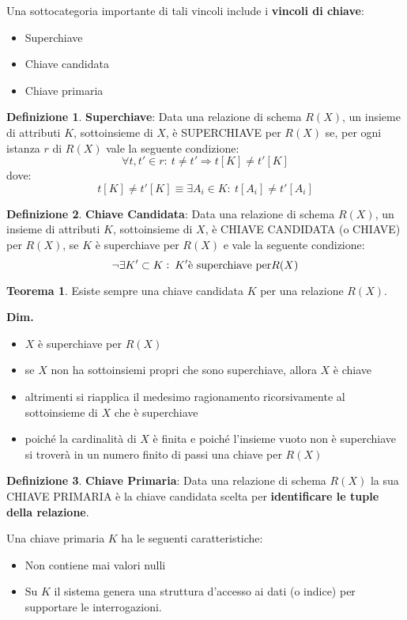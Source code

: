 \documentclass[a4paper, 10pt]{article}
\theoremstyle{definition}
\newtheorem*{defn}{Definizione}
\newtheorem*{theor}{Teorema}
\begin{document}
			Una sottocategoria importante di tali vincoli include i
			\textbf{vincoli di chiave}:
			\begin{itemize}
				\item Superchiave
				\item Chiave candidata
				\item Chiave primaria
			\end{itemize}
			
			\begin{defn}
				\textbf{Superchiave}: Data una relazione di schema $R(X)$, un insieme di attributi $K$, sottoinsieme di $X$, è SUPERCHIAVE per
				$R(X)$ se, per ogni istanza $r$ di $R(X)$ vale la seguente
				condizione:
				\[
					\forall t, t' \in r : 
					\: t \neq t' \Rightarrow t[K] \neq t' [K]
				\]
				dove:
				\[
					t[K] \neq t' [K] \equiv \exists A_i \in K : \:
					 t[A_i] \neq t' [A_i]
				\]
			\end{defn}
			
			\begin{defn}
				\textbf{Chiave Candidata}: 
				Data una relazione di schema $R(X)$, un insieme di
				attributi $K$, sottoinsieme di $X$, è CHIAVE CANDIDATA
				(o CHIAVE) per $R(X)$, se $K$ è superchiave per $R(X)$ e
				vale la seguente condizione:
				\[
					\neg \exists K' \subset K : \: K' 
					\textup{è superchiave per} R(X)
				\]
			\end{defn}
			\begin{theor}
				Esiste sempre una chiave candidata $K$ per una
				relazione $R(X)$.
			\end{theor}
			\textbf{Dim.}
			\begin{itemize}
				\item $X$ è superchiave per $R(X)$
				\item se $X$ non ha sottoinsiemi propri che sono superchiave,
				allora $X$ è chiave
				\item altrimenti si riapplica il medesimo ragionamento
				ricorsivamente al sottoinsieme di $X$ che è superchiave
				\item poiché la cardinalità di $X$ è finita e poiché l'insieme vuoto non è superchiave si troverà in un numero finito di passi
				una chiave per $R(X)$
			\end{itemize}
			
			\begin{defn}
				\textbf{Chiave Primaria}:
				Data una relazione di schema $R(X)$ la sua CHIAVE
				PRIMARIA è la chiave candidata scelta per \textbf{identificare
				le tuple della relazione}.
				
				Una chiave primaria $K$ ha le seguenti caratteristiche:
				\begin{itemize}
					\item Non contiene mai valori nulli
					\item Su $K$ il sistema genera una struttura d'accesso ai dati
					(o indice) per supportare le interrogazioni.
				\end{itemize}
			\end{defn}
			
\end{document}
